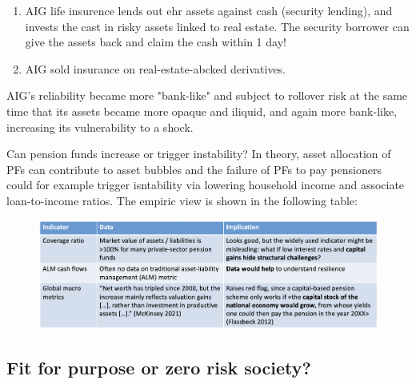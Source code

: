 \documentclass[a4paper]{extarticle}
\begin{document}
\begin{enumerate}
    \item AIG life insurence lends out ehr assets against cash (security lending), and invests the cast in risky assets linked to real estate. The security borrower can give the assets back and claim the cash within 1 day!
    \item AIG sold insurance on real-estate-abcked derivatives.
\end{enumerate}

AIG's reliability became more "bank-like" and subject to rollover risk at the same time that its assets became more opaque and iliquid, and again more bank-like, increasing its vulnerability to a shock.

Can pension funds increase or trigger instability? In theory, asset allocation of PFs can contribute to asset bubbles and the failure of PFs to pay pensioners could for example trigger isntability via lowering household income and associate loan-to-income ratios. The empiric view is shown in the following table:

\begin{figure}[H]
    \includegraphics[width=15cm]{../images/EnpRisk_Fig12-2}
    \centering
\end{figure}

\subsection{Fit for purpose or zero risk society?}
\end{document}
